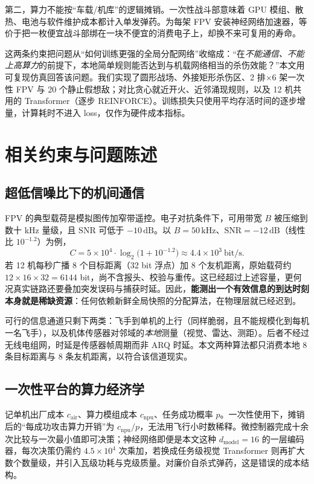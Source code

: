 \documentclass[12pt,a4paper]{article}
\begin{document}
第二，算力不能按“车载/机库”的逻辑摊销。一次性战斗部意味着 GPU 模组、散热、电池与软件维护成本都计入单发弹药。为每架 FPV 安装神经网络加速器，等价于把一枚便宜战斗部绑在一块不便宜的消费电子上，却换不来可复用的寿命。

这两条约束把问题从“如何训练更强的全局分配网络”收缩成：“在\emph{不能通信、不能上高算力}的前提下，本地简单规则能否达到与机载网络相当的杀伤效能？”本文用可复现仿真回答该问题。我们实现了圆形战场、外接矩形杀伤区、2 排$\times$6 架一次性 FPV 与 20 个静止假想敌；对比贪心就近开火、近邻涌现规则，以及 12 机共用的 Transformer（逐步 REINFORCE）。训练损失只使用平均存活时间的逐步增量，计算耗时不进入 loss，仅作为硬件成本指标。

\section{相关约束与问题陈述}

\subsection{超低信噪比下的机间通信}

FPV 的典型载荷是模拟图传加窄带遥控。电子对抗条件下，可用带宽 $B$ 被压缩到数十 kHz 量级，且 $\mathrm{SNR}$ 可低于 $-10\,\mathrm{dB}$\cite{sklar2001}。以 $B=50\,\mathrm{kHz}$、$\mathrm{SNR}=-12\,\mathrm{dB}$（线性比 $10^{-1.2}$）为例，
\begin{equation}
  C = 5\times 10^{4}\cdot \log_2\!\bigl(1+10^{-1.2}\bigr) \approx 4.4\times 10^{3}\ \mathrm{bit/s}.
\end{equation}
若 12 机每秒广播 8 个目标距离（32 bit 浮点）加 8 个友机距离，原始载荷约 $12\times 16\times 32 = 6144$ bit，尚不含报头、校验与重传。这已经超过上述容量，更何况真实链路还要叠加突发误码与捕获时延。因此，\textbf{能测出一个有效信息的到达时刻本身就是稀缺资源}：任何依赖新鲜全局快照的分配算法，在物理层就已经迟到。

可行的信息通道只剩下两类：飞手到单机的上行（同样脆弱，且不能规模化到每机一名飞手），以及机体传感器对邻域的\emph{本地}测量（视觉、雷达、测距）。后者不经过无线电组网，时延是传感器帧周期而非 ARQ 时延。本文两种算法都只消费本地 8 条目标距离与 8 条友机距离，以符合该信道现实。

\subsection{一次性平台的算力经济学}

记单机出厂成本 $c_{\mathrm{air}}$、算力模组成本 $c_{\mathrm{npu}}$、任务成功概率 $p$。一次性使用下，摊销后的“每成功攻击算力开销”为 $c_{\mathrm{npu}}/p$，无法用飞行小时数稀释。微控制器完成十余次比较与一次最小值即可决策；神经网络即便是本文这种 $d_{\mathrm{model}}=16$ 的一层编码器，每次决策仍需约 $4.5\times 10^{4}$ 次乘加，若换成任务级视觉 Transformer 则再扩大数个数量级，并引入瓦级功耗与克级质量。对廉价自杀式弹药，这是错误的成本结构。
\end{document}
